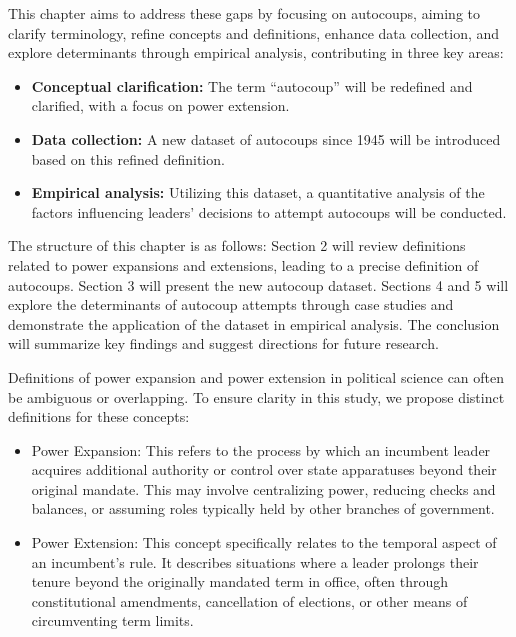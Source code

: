 \documentclass[
  12pt,
]{report}
\begin{document}
This chapter aims to address these gaps by focusing on autocoups, aiming
to clarify terminology, refine concepts and definitions, enhance data
collection, and explore determinants through empirical analysis,
contributing in three key areas:

\begin{itemize}
\item
  \textbf{Conceptual clarification:} The term ``autocoup'' will be
  redefined and clarified, with a focus on power extension.
\item
  \textbf{Data collection:} A new dataset of autocoups since 1945 will
  be introduced based on this refined definition.
\item
  \textbf{Empirical analysis:} Utilizing this dataset, a quantitative
  analysis of the factors influencing leaders' decisions to attempt
  autocoups will be conducted.
\end{itemize}

The structure of this chapter is as follows: Section 2 will review
definitions related to power expansions and extensions, leading to a
precise definition of autocoups. Section 3 will present the new autocoup
dataset. Sections 4 and 5 will explore the determinants of autocoup
attempts through case studies and demonstrate the application of the
dataset in empirical analysis. The conclusion will summarize key
findings and suggest directions for future research.

Definitions of power expansion and power extension in political science
can often be ambiguous or overlapping. To ensure clarity in this study,
we propose distinct definitions for these concepts:

\begin{itemize}
\item
  Power Expansion: This refers to the process by which an incumbent
  leader acquires additional authority or control over state apparatuses
  beyond their original mandate. This may involve centralizing power,
  reducing checks and balances, or assuming roles typically held by
  other branches of government.
\item
  Power Extension: This concept specifically relates to the temporal
  aspect of an incumbent's rule. It describes situations where a leader
  prolongs their tenure beyond the originally mandated term in office,
  often through constitutional amendments, cancellation of elections, or
  other means of circumventing term limits.
\end{itemize}
\end{document}
